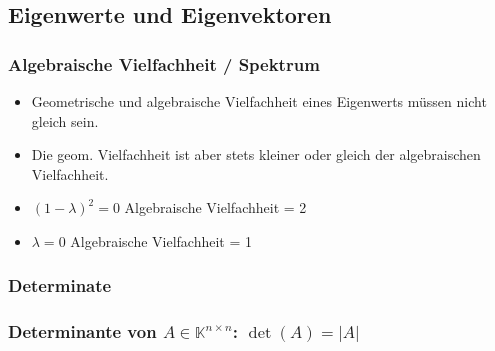 \documentclass[6pt,a4paper]{scrartcl}
\begin{document}
\begin{multicols*}{4}
\begin{itemize}
				\end{itemize}
		
				
		\subsection{Eigenwerte und Eigenvektoren}
			\subsubsection{Algebraische Vielfachheit / Spektrum}
				\begin{itemize}\itemsep0pt				
					\item Geometrische und algebraische Vielfachheit eines Eigenwerts müssen nicht gleich sein. 
					\item Die geom. Vielfachheit ist aber stets kleiner oder gleich der algebraischen Vielfachheit.
					\item $(1-\lambda)^{2} = 0$ \qquad Algebraische Vielfachheit = 2
					\item $\lambda = 0$ \qquad \qquad \qquad Algebraische Vielfachheit = 1
				\end{itemize}
			\subsubsection{Determinate}
			
			\subsubsection{Determinante von $A\in \mathbb K^{n\times n}$: $\det(A)=|A|$}


\end{multicols*}
\end{document}
